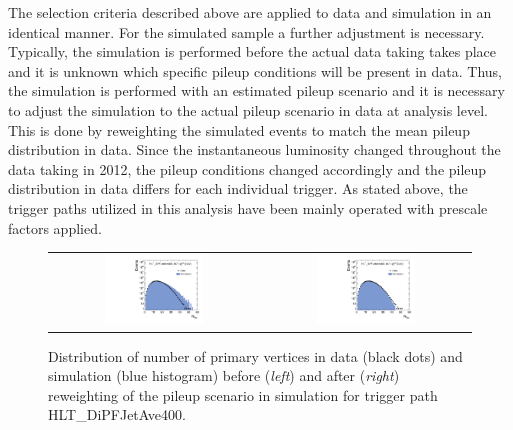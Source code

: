 The selection criteria described above are applied to data and simulation in an identical manner. For the simulated sample a further adjustment is necessary. Typically, the simulation is performed before the actual data taking takes place and it is unknown which specific pileup conditions will be present in data. Thus, the simulation is performed with an estimated pileup scenario and it is necessary to adjust the simulation to the actual pileup scenario in data at analysis level. This is done by reweighting the simulated events to match the mean pileup distribution in data. Since the instantaneous luminosity changed throughout the data taking in 2012, the pileup conditions changed accordingly and the pileup distribution in data differs for each individual trigger. As stated above, the trigger paths utilized in this analysis have been mainly operated with prescale factors applied. 
\begin{figure}[!t]
  \centering
  \begin{tabular}{cc}
                \includegraphics[width=0.49\textwidth]{figures/NVtx_HltDiPFJetAve400_AfterTriggerSelection.pdf} &
                \includegraphics[width=0.49\textwidth]{figures/NVtx_HltDiPFJetAve400_AfterPUReweighting.pdf}
  \end{tabular}
  \caption{Distribution of number of primary vertices in data (black dots) and simulation (blue histogram) before (\textit{left}) and after (\textit{right}) reweighting of the pileup scenario in simulation for trigger path HLT\_DiPFJetAve400.}
  \label{fig:pu_reweight}
\end{figure}
